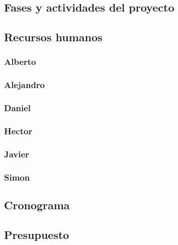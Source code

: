 \documentclass[11pt,spanish]{article}
\begin{document}
\subsection{Fases y actividades del proyecto}


\subsection{Recursos humanos}


\subsubsection*{Alberto}

\subsubsection*{Alejandro}

\subsubsection*{Daniel}

\subsubsection*{Hector}

\subsubsection*{Javier}

\subsubsection*{Simon}




\subsection{Cronograma}


\subsection{Presupuesto}

\end{document}
